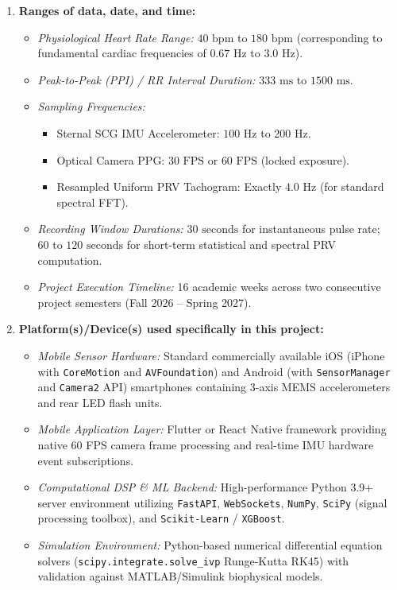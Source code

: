 \documentclass[11pt,a4paper]{article}
\begin{document}
\begin{enumerate}[leftmargin=2.5em]
    \item \textbf{Ranges of data, date, and time:}
    \begin{itemize}
        \item \textit{Physiological Heart Rate Range:} $40 \text{ bpm}$ to $180 \text{ bpm}$ (corresponding to fundamental cardiac frequencies of $0.67\text{ Hz}$ to $3.0\text{ Hz}$).
        \item \textit{Peak-to-Peak (PPI) / RR Interval Duration:} $333\text{ ms}$ to $1500\text{ ms}$.
        \item \textit{Sampling Frequencies:}
        \begin{itemize}
            \item Sternal SCG IMU Accelerometer: $100\text{ Hz}$ to $200\text{ Hz}$.
            \item Optical Camera PPG: $30\text{ FPS}$ or $60\text{ FPS}$ (locked exposure).
            \item Resampled Uniform PRV Tachogram: Exactly $4.0\text{ Hz}$ (for standard spectral FFT).
        \end{itemize}
        \item \textit{Recording Window Durations:} $30\text{ seconds}$ for instantaneous pulse rate; $60\text{ to }120\text{ seconds}$ for short-term statistical and spectral PRV computation.
        \item \textit{Project Execution Timeline:} 16 academic weeks across two consecutive project semesters (Fall 2026 -- Spring 2027).
    \end{itemize}

    \item \textbf{Platform(s)/Device(s) used specifically in this project:}
    \begin{itemize}
        \item \textit{Mobile Sensor Hardware:} Standard commercially available iOS (iPhone with \texttt{CoreMotion} and \texttt{AVFoundation}) and Android (with \texttt{SensorManager} and \texttt{Camera2} API) smartphones containing 3-axis MEMS accelerometers and rear LED flash units.
        \item \textit{Mobile Application Layer:} Flutter or React Native framework providing native 60 FPS camera frame processing and real-time IMU hardware event subscriptions.
        \item \textit{Computational DSP \& ML Backend:} High-performance Python 3.9+ server environment utilizing \texttt{FastAPI}, \texttt{WebSockets}, \texttt{NumPy}, \texttt{SciPy} (signal processing toolbox), and \texttt{Scikit-Learn} / \texttt{XGBoost}.
        \item \textit{Simulation Environment:} Python-based numerical differential equation solvers (\texttt{scipy.integrate.solve\_ivp} Runge-Kutta RK45) with validation against MATLAB/Simulink biophysical models.
    \end{itemize}
\end{enumerate}
\end{document}
